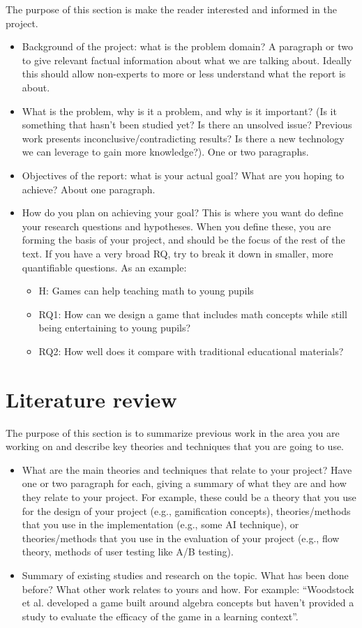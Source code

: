 \documentclass[conference]{IEEEtran}
\begin{document}
The purpose of this section is make the reader interested and informed in the project.
\begin{itemize}
	\item Background of the project: what is the problem domain? A paragraph or two to give relevant factual information about what we are talking about. Ideally this should allow non-experts to more or less understand what the report is about.
	\item What is the problem, why is it a problem, and why is it important? (Is it something that hasn’t been studied yet? Is there an unsolved issue? Previous work presents inconclusive/contradicting results? Is there a new technology we can leverage to gain more knowledge?). One or two paragraphs.
	\item Objectives of the report: what is your actual goal? What are you hoping to achieve? About one paragraph.
	\item How do you plan on achieving your goal? This is where you want do define your research questions and hypotheses. When you define these, you are forming the basis of your project, and should be the focus of the rest of the text. If you have a very broad RQ, try to break it down in smaller, more quantifiable questions. As an example:
	\begin{itemize}
		\item H: Games can help teaching math to young pupils
		\item RQ1: How can we design a game that includes math concepts while still being entertaining to young pupils?
		\item RQ2: How well does it compare with traditional educational materials?
	\end{itemize}
\end{itemize}

\section{Literature review}

The purpose of this section is to summarize previous work in the area you are working on and describe key theories and techniques that you are going to use.
\begin{itemize}
	\item What are the main theories and techniques that relate to your project? Have one or two paragraph for each, giving a summary of what they are and how they relate to your project. For example, these could be a theory that you use for the design of your project (e.g., gamification concepts), theories/methods that you use in the implementation (e.g., some AI technique), or theories/methods that you use in the evaluation of your project (e.g., flow theory, methods of user testing like A/B testing).
	\item Summary of existing studies and research on the topic. What has been done before? What other work relates to yours and how. For example: “Woodstock et al. developed a game built around algebra concepts \cite{woodstock2018} but haven’t provided a study to evaluate the efficacy of the game in a learning context”.
\end{itemize}
\end{document}
